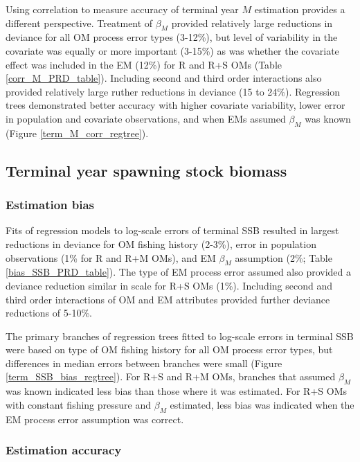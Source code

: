 \documentclass[
  12pt,
]{article}
\begin{document}
Using correlation to measure accuracy of terminal year \(M\) estimation provides a different perspective. Treatment of \(\beta_M\) provided relatively large reductions in deviance for all OM process error types (3-12\%), but level of variability in the covariate was equally or more important (3-15\%) as was whether the covariate effect was included in the EM (12\%) for R and R+S OMs (Table \ref{corr_M_PRD_table}). Including second and third order interactions also provided relatively large ruther reductions in deviance (15 to 24\%). Regression trees demonstrated better accuracy with higher covariate variability, lower error in population and covariate observations, and when EMs assumed \(\beta_M\) was known (Figure \ref{term_M_corr_regtree}).

\subsection*{Terminal year spawning stock biomass}\label{terminal-year-spawning-stock-biomass}

\subsubsection*{Estimation bias}\label{estimation-bias-3}

Fits of regression models to log-scale errors of terminal SSB resulted in largest reductions in deviance for OM fishing history (2-3\%), error in population observations (1\% for R and R+M OMs), and EM \(\beta_M\) assumption (2\%; Table \ref{bias_SSB_PRD_table}). The type of EM process error assumed also provided a deviance reduction similar in scale for R+S OMs (1\%). Including second and third order interactions of OM and EM attributes provided further deviance reductions of 5-10\%.

The primary branches of regression trees fitted to log-scale errors in terminal SSB were based on type of OM fishing history for all OM process error types, but differences in median errors between branches were small (Figure \ref{term_SSB_bias_regtree}). For R+S and R+M OMs, branches that assumed \(\beta_M\) was known indicated less bias than those where it was estimated. For R+S OMs with constant fishing pressure and \(\beta_M\) estimated, less bias was indicated when the EM process error assumption was correct.

\subsubsection*{Estimation accuracy}\label{estimation-accuracy-1}
\end{document}
